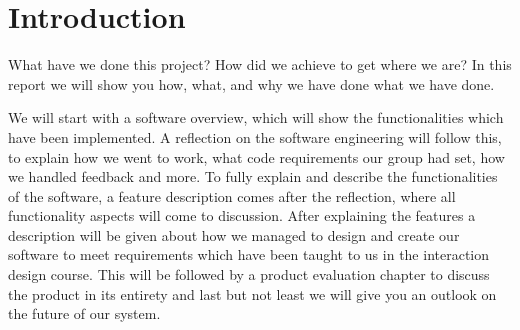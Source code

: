 \chapter{Introduction} %

What have we done this project? How did we achieve to get where we are? In this report we will show you how, what, and why we have done what we have done.

We will start with a software overview, which will show the functionalities which have been implemented. A reflection on the software engineering will follow this, to explain how we went to work, what code requirements our group had set, how we handled feedback and more. To fully explain and describe the functionalities of the software, a feature description comes after the reflection, where all functionality aspects will come to discussion. After explaining the features a description will be given about how we managed to design and create our software to meet requirements which have been taught to us in the interaction design course. This will be followed by a product evaluation chapter to discuss the product in its entirety and last but not least we will give you an outlook on the future of our system. 